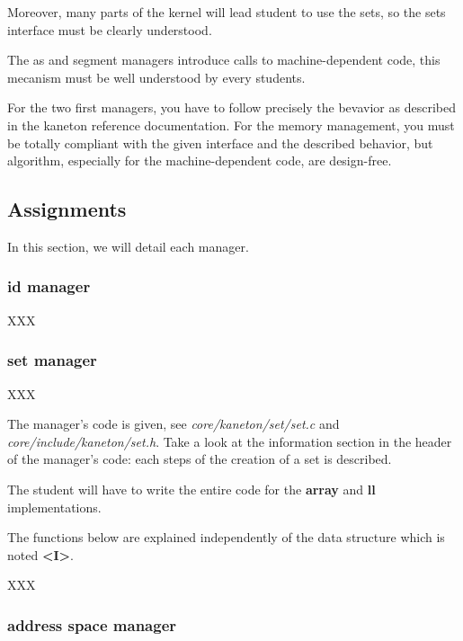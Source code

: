 Moreover, many parts of the kernel will lead student to use the sets,
so the sets interface must be clearly understood.

The as and segment managers introduce calls to machine-dependent code, this
mecanism must be well understood by every students.

For the two first managers, you have to follow precisely the bevavior
as described in the kaneton reference documentation. For the memory
management, you must be totally compliant with the given interface and
the described behavior, but algorithm, especially for the machine-dependent
code, are design-free.

%
%

\subsection{Assignments}

In this section, we will detail each manager.

%
%

\subsubsection{id manager}

XXX

%
%

\subsubsection{set manager}

XXX

The manager's code is given, see \textit{core/kaneton/set/set.c} and
\textit{core/include/kaneton/set.h}. Take a look at the information
section in the header of the manager's code: each steps of the creation
of a set is described.

The student will have to write the entire code for the \textbf{array}
and \textbf{ll} implementations.

The functions below are explained independently of the data structure
which is noted \textbf{<I>}.

XXX

%
%

\subsubsection{address space manager}

